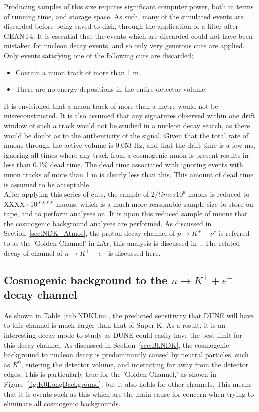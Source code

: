 Producing samples of this size requires significant computer power, both in terms of running time, and storage space. As such, many of the simulated events are discarded before being saved to disk, through the application of a filter after GEANT4. It is essential that the events which are discarded could not have been mistaken for nucleon decay events, and so only very generous cuts are applied. Only events satisfying one of the following cuts are discarded;
\begin{itemize}
\item Contain a muon track of more than 1 m.
\item There are no energy depositions in the entire detector volume.
\end{itemize}
It is envisioned that a muon track of more than a metre would not be misreconstructed. It is also assumed that any signatures observed within one drift window of such a track would not be studied in a nucleon decay search, as there would be doubt as to the authenticity of the signal. Given that the total rate of muons through the active volume is 0.053 Hz, and that the drift time is a few ms, ignoring all times where any track from a cosmogenic muon is present results in less than 0.1\% dead time. The dead time associated with ignoring events with muon tracks of more than 1 m is clearly less than this. This amount of dead time is assumed to be acceptable. \\

After applying this series of cuts, the sample of 2$/times$10$^9$ muons is reduced to XXXX$\times$10$^{XXXX}$ muons, which is a much more reasonable sample size to store on tape, and to perform analyses on. It is upon this reduced sample of muons that the cosmogenic background analyses are performed. As discussed in Section~\ref{sec:NDK_Atmos}, the proton decay channel of $p \rightarrow K^{+} + \nu^{e}$ is referred to as the 'Golden Channel' in LAr, this analysis is discussed in~\citep{NDKTFNote}. The related decay of channel of $n \rightarrow K^{+} + e^{-}$ is discussed here. \\

\subsection{Cosmogenic background to the $n \rightarrow K^{+} + e^{-}$ decay channel} \label{sec:NDKCosmBk}
As shown in Table~\ref{tab:NDKLim}, the predicted sensitivity that DUNE will have to this channel is much larger than that of Super-K. As a result, it is an interesting decay mode to study as DUNE could easily have the best limit for this decay channel. As discussed in Section~\ref{sec:BkNDK}, the cosmogenic background to nucleon decay is predominantly caused by neutral particles, such as $K^0$, entering the detector volume, and interacting far away from the detector edges. This is particularly true for the 'Golden Channel,' as shown in Figure~\ref{fig:K0LongBackground}, but it also holds for other channels. This means that it is events such as this which are the main cause for concern when trying to eliminate all cosmogenic backgrounds. \\

